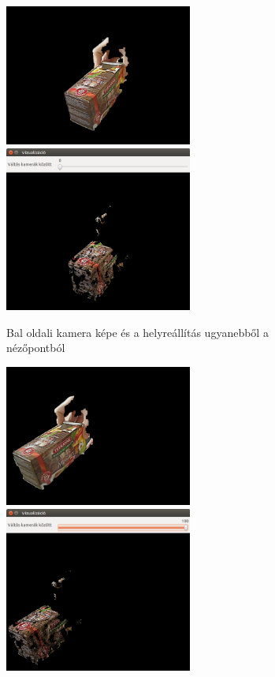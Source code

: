 \begin{figure}[tbh]
\centering
\begin{subfigure}[b]{.43\linewidth}
	\centering
	\includegraphics[width=175pt]{figures/of_img_left.png}\\\vspace{10pt}
	\includegraphics[width=175pt]{figures/visu_pixels_left.png}
	\caption{Bal oldali kamera képe és a helyre\-ál\-lí\-tás ugyanebből a nézőpontból}
  \end{subfigure}\hspace{30pt}
\begin{subfigure}[b]{.43\linewidth}
	\centering
	\includegraphics[width=175pt]{figures/of_img_right.png}\\\vspace{10pt}
	\includegraphics[width=175pt]{figures/visu_pixels_right.png}

\end{subfigure}
\end{figure}
